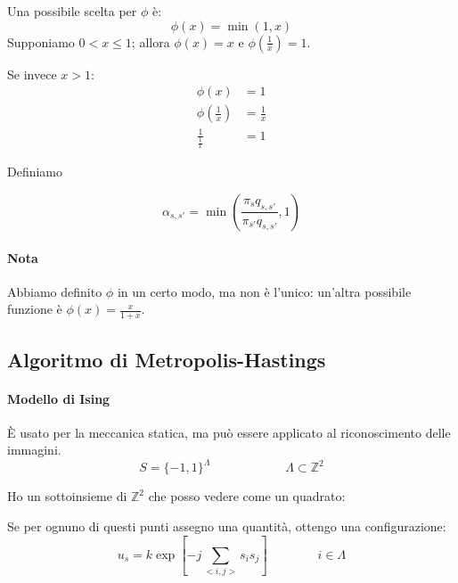 \documentclass[a4paper,12pt]{book}
\newcommand\ddfrac[2]{\frac{\displaystyle #1}{\displaystyle #2}}
\begin{document}
Una possibile scelta per $\phi$ è:
$$ \phi(x) = \min(1,x) $$
Supponiamo $ 0 < x \le 1 $; allora $ \phi(x) = x $ e $ \phi(\frac{1}{x}) = 1 $.

Se invece $ x > 1 $: 
\begin{align*}
	\phi(x) & = 1 \\
	\phi(\frac{1}{x}) & = \frac{1}{x} \\
	\frac{1}{\frac{1}{x}} & = 1
\end{align*}

Definiamo

$$ \alpha_{s,s'} = \min\left(\ddfrac{\pi_s q_{s,s'}}{\pi_{s'}q_{s,s'}}, 1\right)$$ %

\paragraph{Nota} Abbiamo definito $\phi$ in un certo modo, ma non è l'unico: un'altra possibile funzione è $ \phi(x) = \ddfrac{x}{1+x} $.

\subsection{Algoritmo di Metropolis-Hastings}
\paragraph{Modello di Ising}
È usato per la meccanica statica, ma può essere applicato al riconoscimento delle immagini. 
$$ S = \{-1, 1\}^\Lambda \qquad \qquad \qquad \Lambda \subset \mathbb{Z}^2 $$

Ho un sottoinsieme di $ \mathbb{Z}^2 $ che posso vedere come un quadrato:

\begin{multicols}{2}
	
	Se per ognuno di questi punti assegno una quantità, ottengo una configurazione:
	$$ u_s = k \exp \left[-j \sum_{<i,j>}s_i s_j\right] \qquad \qquad i \in \Lambda $$
\end{multicols}
\end{document}
